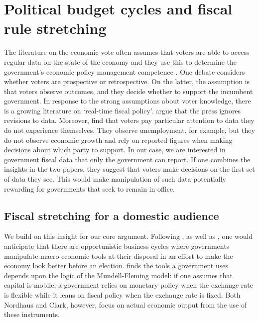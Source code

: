 \documentclass[]{article}
\begin{document}

\section{Political budget cycles and fiscal rule stretching}

The literature on the economic vote often assumes that voters are able to access regular data on the state of the economy and they use this to determine the government's economic policy management competence \citep[for a discussion see][]{Ansolabehere2014}. One debate considers whether voters are prospective or retrospective. On the latter, the assumption is that voters observe outcomes, and they decide whether to support the incumbent government. In response to the strong assumptions about voter knowledge, there is a growing literature on `real-time fiscal policy'. \cite{KayserLeininger2015} argue that the press ignores revisions to data. Moreover, \cite{kayser_peress} find that voters pay particular attention to data they do not experience themselves. They observe unemployment, for example, but they do not observe economic growth and rely on reported figures when making decisions about which party to support. In our case, we are interested in government fiscal data that only the government can report. If one combines the insights in the two papers, they suggest that voters make decisions on the first set of data they see. This would make manipulation of such data potentially rewarding for governments that seek to remain in office.

\subsection{Fiscal stretching for a domestic audience}

We build on this insight for our core argument. Following \cite{nordhaus1975}, as well as \cite{Alt2014}, one would anticipate that there are opportunistic business cycles where governments manipulate macro-economic tools at their disposal in an effort to make the economy look better before an election. \cite{clark2003} finds the tools a government uses depends upon the logic of the Mundell-Fleming model: if one assumes that capital is mobile, a government relies on monetary policy when the exchange rate is flexible while it leans on fiscal policy when the exchange rate is fixed. Both Nordhaus and Clark, however, focus on actual economic output from the use of these instruments.
\end{document}
